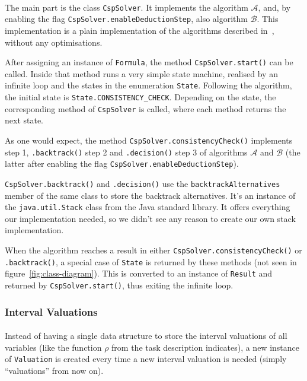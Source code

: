 \paragraph{}
The main part is the class \texttt{CspSolver}.
It implements the algorithm $\mathcal{A}$, and, by enabling the flag \texttt{CspSolver.enableDeductionStep}, also algorithm $\mathcal{B}$. This implementation is a plain implementation of the algorithms described in~\cite{MF19}, without any optimisations.

After assigning an instance of \texttt{Formula}, the method \texttt{CspSolver.start()} can be called.
Inside that method runs a very simple state machine, realised by an infinite loop and the states in the enumeration \texttt{State}.
Following the algorithm, the initial state is \texttt{State.CONSISTENCY\_CHECK}.
Depending on the state, the corresponding method of \texttt{CspSolver} is called, where each method returns the next state.

As one would expect, the method \texttt{CspSolver.consistencyCheck()} implements step 1, \texttt{.backtrack()} step 2 and \texttt{.decision()} step 3 of algorithms $\mathcal{A}$ and $\mathcal{B}$ (the latter after enabling the flag \texttt{CspSolver.enableDeductionStep}).

\texttt{CspSolver.backtrack()} and \texttt{.decision()} use the \texttt{backtrackAlternatives} member of the same class to store the backtrack alternatives.
It's an instance of the \texttt{java.util.Stack} class from the Java standard library.
It offers everything our implementation needed, so we didn't see any reason to create our own stack implementation.

When the algorithm reaches a result in either \texttt{CspSolver.consistencyCheck()} or \texttt{.backtrack()}, a special case of \texttt{State} is returned by these methods (not seen in figure~\ref{fig:class-diagram}).
This is converted to an instance of \texttt{Result} and returned by \texttt{CspSolver.start()}, thus exiting the infinite loop.


\subsubsection{Interval Valuations}\label{ssec:valuations}

\paragraph{}
Instead of having a single data structure to store the interval valuations of all variables (like the function $\rho$ from the task description indicates), a new instance of \texttt{Valuation} is created every time a new interval valuation is needed (simply ``valuations'' from now on).

